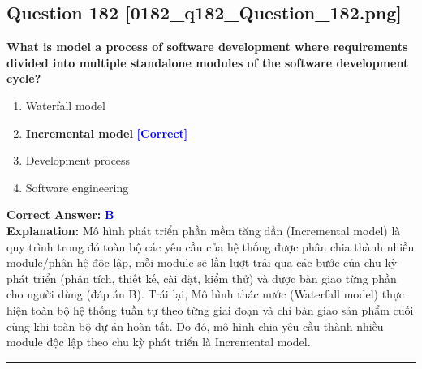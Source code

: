 \documentclass[11pt,a4paper]{article}
\begin{document}
\begin{minipage}{\textwidth}
\subsection*{Question 182 \quad \footnotesize{[0182\_q182\_Question\_182.png]}}
\noindent \textbf{What is model a process of software development where requirements divided into multiple standalone modules of the software development cycle?}

\begin{enumerate}[label=\Alph*.]
    \item Waterfall model
    \item \textbf{Incremental model} \hfill \textcolor{blue}{\textbf{[Correct]}}
    \item Development process
    \item Software engineering
\end{enumerate}

\noindent \textbf{Correct Answer:} \textcolor{blue}{\textbf{B}} \\[2pt]
\noindent \textbf{Explanation:} Mô hình phát triển phần mềm tăng dần (Incremental model) là quy trình trong đó toàn bộ các yêu cầu của hệ thống được phân chia thành nhiều module/phân hệ độc lập, mỗi module sẽ lần lượt trải qua các bước của chu kỳ phát triển (phân tích, thiết kế, cài đặt, kiểm thử) và được bàn giao từng phần cho người dùng (đáp án B). Trái lại, Mô hình thác nước (Waterfall model) thực hiện toàn bộ hệ thống tuần tự theo từng giai đoạn và chỉ bàn giao sản phẩm cuối cùng khi toàn bộ dự án hoàn tất. Do đó, mô hình chia yêu cầu thành nhiều module độc lập theo chu kỳ phát triển là Incremental model.

\par\vspace{0.3cm}
\hrule
\vspace{0.3cm}
\end{minipage}
\end{document}
